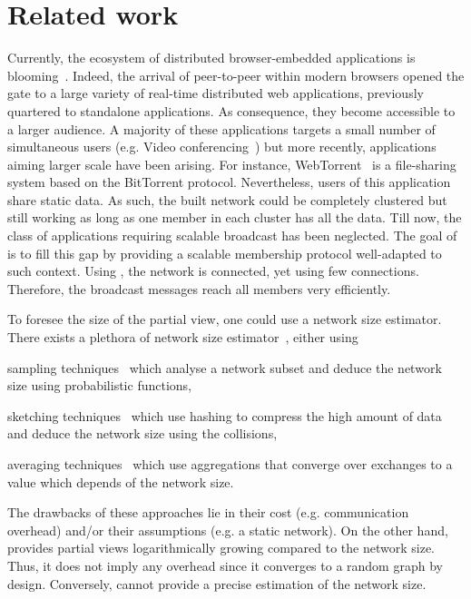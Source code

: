 
\section{Related work}
\label{sec:relatedwork}

Currently, the ecosystem of distributed browser-embedded applications is
blooming~\cite{firefoxhello,sharefest,webtorrent}. Indeed, the arrival of
peer-to-peer within modern browsers opened the gate to a large variety of
real-time distributed web applications, previously quartered to standalone
applications. As consequence, they become accessible to a larger audience. A
majority of these applications targets a small number of simultaneous users
(e.g. Video conferencing~\cite{firefoxhello}) but more recently, applications
aiming larger scale have been arising. For instance,
WebTorrent~\cite{webtorrent} is a file-sharing system based on the BitTorrent
protocol. Nevertheless, users of this application share static data. As such,
the built network could be completely clustered but still working as long as
one member in each cluster has all the data.  Till now, the class of
applications requiring scalable broadcast has been neglected. The goal of
\SCAMPLON{} is to fill this gap by providing a scalable membership protocol
well-adapted to such context. Using \SCAMPLON{}, the network is connected, yet
using few connections. Therefore, the broadcast messages reach all members very
efficiently.

To foresee the size of the partial view, one could use a network size
estimator. There exists a plethora of network size
estimator~\cite{jelasity2004epidemic, ganesh2007peer, kostoulas2007active,
  baquero2012extrema}, either using
\begin{inparaenum}[(i)]
\item sampling techniques~\cite{mane05network, ganesh2007peer,
    kostoulas2007active} which analyse a network subset and deduce the network
  size using probabilistic functions,
\item sketching techniques~\cite{baquero2012extrema} which use hashing to
  compress the high amount of data and deduce the network size using the
  collisions,
\item averaging techniques~\cite{jelasity2004epidemic} which use aggregations
  that converge over exchanges to a value which depends of the network size.
\end{inparaenum}
The drawbacks of these approaches lie in their cost (e.g. communication
overhead) and/or their assumptions (e.g. a static network). On the other hand,
\SCAMPLON{} provides partial views logarithmically growing compared to the
network size. Thus, it does not imply any overhead since it converges to a
random graph by design. Conversely, \SCAMPLON{} cannot provide a precise
estimation of the network size.

